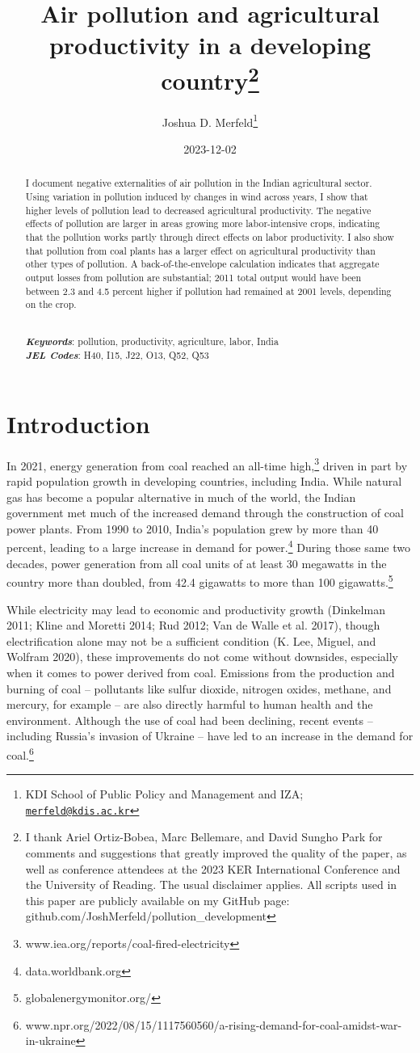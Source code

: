 \documentclass[
]{article}
\title{Air pollution and agricultural productivity in a developing country\footnote{I thank Ariel Ortiz-Bobea, Marc Bellemare, and David Sungho Park for comments and suggestions that greatly improved the quality of the paper, as well as conference attendees at the 2023 KER International Conference and the University of Reading. The usual disclaimer applies. All scripts used in this paper are publicly available on my GitHub page: github.com/JoshMerfeld/pollution\_development}}
\author{Joshua D. Merfeld\footnote{KDI School of Public Policy and Management and IZA; \href{mailto:merfeld@kdis.ac.kr}{\nolinkurl{merfeld@kdis.ac.kr}}}}
\date{2023-12-02}
\begin{document}
\maketitle
\begin{abstract}
\noindent I document negative externalities of air pollution in the Indian agricultural sector. Using variation in pollution induced by changes in wind across years, I show that higher levels of pollution lead to decreased agricultural productivity. The negative effects of pollution are larger in areas growing more labor-intensive crops, indicating that the pollution works partly through direct effects on labor productivity. I also show that pollution from coal plants has a larger effect on agricultural productivity than other types of pollution. A back-of-the-envelope calculation indicates that aggregate output losses from pollution are substantial; 2011 total output would have been between 2.3 and 4.5 percent higher if pollution had remained at 2001 levels, depending on the crop.\\
\strut \\
\textbf{\textit{Keywords}}: pollution, productivity, agriculture, labor, India\\
\textbf{\textit{JEL Codes}}: H40, I15, J22, O13, Q52, Q53
\end{abstract}

\newpage
\doublespacing

\hypertarget{introduction}{%
\section{Introduction}\label{introduction}}

In 2021, energy generation from coal reached an all-time high,\footnote{www.iea.org/reports/coal-fired-electricity} driven in part by rapid population growth in developing countries, including India. While natural gas has become a popular alternative in much of the world, the Indian government met much of the increased demand through the construction of coal power plants. From 1990 to 2010, India's population grew by more than 40 percent, leading to a large increase in demand for power.\footnote{data.worldbank.org} During those same two decades, power generation from all coal units of at least 30 megawatts in the country more than doubled, from 42.4 gigawatts to more than 100 gigawatts.\footnote{globalenergymonitor.org/}

While electricity may lead to economic and productivity growth (Dinkelman 2011; Kline and Moretti 2014; Rud 2012; Van de Walle et al. 2017), though electrification alone may not be a sufficient condition (K. Lee, Miguel, and Wolfram 2020), these improvements do not come without downsides, especially when it comes to power derived from coal. Emissions from the production and burning of coal -- pollutants like sulfur dioxide, nitrogen oxides, methane, and mercury, for example -- are also directly harmful to human health and the environment. Although the use of coal had been declining, recent events -- including Russia's invasion of Ukraine -- have led to an increase in the demand for coal.\footnote{www.npr.org/2022/08/15/1117560560/a-rising-demand-for-coal-amidst-war-in-ukraine}
\end{document}
